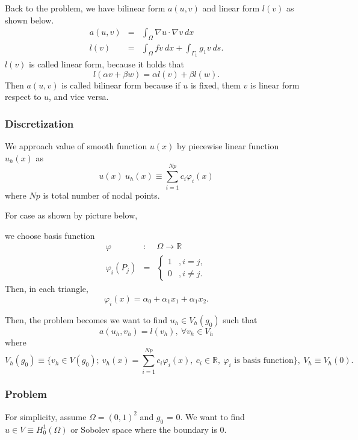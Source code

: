 \documentclass[a4paper,10pt]{article}
\begin{document}
Back to the problem, we have bilinear form $ a(u,v) $ and linear form $ l(v) $ as shown below.
\begin{eqnarray}\nonumber
a(u,v) &=&  \int_{\Omega} \nabla u \cdot \nabla v \ dx \\ \nonumber
l(v) &=& \int_{\Omega} f v \ dx + \int_{\Gamma_{1}} g_{1} v \ ds.
\end{eqnarray}
$ l(v) $ is called linear form, because it holds that
\[ l(\alpha v + \beta w) = \alpha l(v) + \beta l(w). \]
Then $ a(u,v) $ is called bilinear form because if $ u $ is fixed, them $ v $ is linear form respect to $ u $, and vice versa.

\subsubsection{Discretization}
We approach value of smooth function $ u(x) $ by piecewise linear function $ u_{h}(x) $ as
\[ u(x) ~ u_{h}(x) \equiv \sum_{i=1}^{Np} c_{i} \varphi_{i}(x) \]
where $ Np $ is total number of nodal points.

\vspace{4cm}

For case as shown by picture below,

\vspace{4cm}

we choose basis function
\begin{eqnarray}\nonumber
\varphi &:& \Omega \rightarrow \mathbb{R}\\ \nonumber
\varphi_{i} (P_{j}) &=& \begin{cases}
1 &, i=j, \\
0 &, i \neq j. 
\end{cases}
\end{eqnarray}
Then, in each triangle,
\[ \varphi_{i}(x) = \alpha_{0} + \alpha_{1}x_{1} + \alpha_{1}x_{2}. \]

\vspace{4cm}

Then, the problem becomes we want to find $ u_{h} \in V_{h}(g_{0}) $ such that
\[ a(u_{h}, v_{h}) = l(v_{h}), \ \forall v_{h} \in V_{h} \]
where
\[ V_{h}(g_{0}) \equiv \{ v_{h} \in V(g_{0}); \ v_{h}(x) = \sum_{i=1}^{Np} c_{i} \varphi_{i}(x), \ c_{i} \in \mathbb{R}, \ \varphi_{i} \text{ is basis function} \} , \ V_{h} \equiv V_{h}(0). \]

\subsubsection{Problem}
For simplicity, assume $ \Omega = (0,1)^2 $ and $ g_{0} $ = 0. We want to find $ u \in V \equiv H_{0}^{1}(\Omega) $ or Sobolev space where the boundary is $ 0 $.
\end{document}

